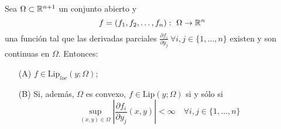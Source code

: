 \documentclass[a4paper]{report}
\begin{document}
\begin{theorem}
	Sea $\Omega\subset\mathbb{R}^{n+1}$ un conjunto abierto y
	\[ f = (f_1,f_2,\dots,f_n):\ \Omega \to \mathbb{R}^n \]
	\noindent una función tal que las derivadas parciales $\frac{\partial f_i}{\partial y_j}\ \forall i,j \in \{1,\dots,n\}$ existen y son continuas en $\Omega$. Entonces:
	\begin{enumerate}
		\item[(A)] $f \in \text{Lip}_{\textit{loc}}(y;\Omega)$;

		\item[(B)] Si, además, $\Omega$ es convexo, $f \in \text{Lip}(y;\Omega)$ si y sólo si
		\[ \sup_{(x,y)\in\Omega} \left| \frac{\partial f_i}{\partial y_j}(x,y) \right| < \infty \quad \forall i,j \in \{ 1,\dots, n \} \]
	\end{enumerate}
\end{theorem}





\end{document}
